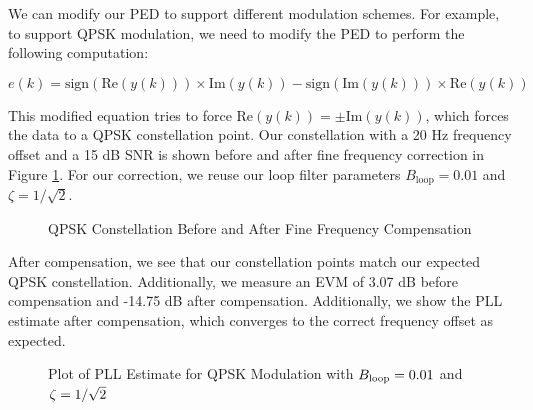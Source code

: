 \documentclass{article}
\begin{document}
We can modify our PED to support different modulation schemes. For example, to support QPSK modulation, we need to modify the PED to perform the following computation:

\begin{equation}
	e(k) = \text{sign}(\text{Re}(y(k))) \times \text{Im}(y(k)) - \text{sign}(\text{Im}(y(k))) \times \text{Re}(y(k))
\end{equation}

\noindent This modified equation tries to force $\text{Re}(y(k)) = \pm \text{Im}(y(k))$, which forces the data to a QPSK constellation point. Our constellation with a 20 Hz frequency offset and a 15 dB SNR is shown before and after fine frequency correction in Figure \ref{fig::fine_freq_comp_qpsk_const}. For our correction, we reuse our loop filter parameters $B_{\text{loop}}=0.01$ and $\zeta=1/\sqrt{2}$.

\begin{figure}[H]
	\centerline{}
	\caption{QPSK Constellation Before and After Fine Frequency Compensation}
	\label{fig::fine_freq_comp_qpsk_const}
\end{figure}

\noindent After compensation, we see that our constellation points match our expected QPSK constellation. Additionally, we measure an EVM of 3.07 dB before compensation and -14.75 dB after compensation. Additionally, we show the PLL estimate after compensation, which converges to the correct frequency offset as expected.

\begin{figure}[H]
	\centerline{}
	\caption{Plot of PLL Estimate for QPSK Modulation with $\protect{B_\text{loop}} = 0.01$ and $\protect{\zeta = 1/\sqrt{2}}$}
	\label{fig::convergence_qpsk_Bloop_0p01_damp_sqrt_2}
\end{figure}
\end{document}
